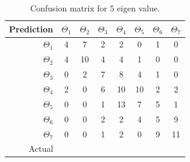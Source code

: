 \documentclass[runningheads,a4paper]{llncs}
\begin{document}
\begin{table}
\centering
\caption{Confusion matrix for $5$ eigen value.}
\label{tab:conf5}
\begin{tabular}{@{}r|ccccccc@{}}
\toprule
Prediction & \multicolumn{1}{r}{$\Theta_1$} & \multicolumn{1}{r}{$\Theta_2$} & \multicolumn{1}{r}{$\Theta_3$} & \multicolumn{1}{r}{$\Theta_4$} & \multicolumn{1}{r}{$\Theta_5$} & \multicolumn{1}{r}{$\Theta_6$} & \multicolumn{1}{r}{$\Theta_7$} \\ \midrule
$\Theta_1$ & 4                              & 7                              & 2                              & 2                              & 0                              & 1                              & 0                              \\
$\Theta_2$ & 4                              & 10                             & 4                              & 4                              & 1                              & 0                              & 0                              \\
$\Theta_3$ & 0                              & 2                              & 7                              & 8                              & 4                              & 1                              & 0                              \\
$\Theta_4$ & 2                              & 0                              & 6                              & 10                             & 10                             & 2                              & 2                              \\
$\Theta_5$ & 0                              & 0                              & 1                              & 13                             & 7                              & 5                              & 1                              \\
$\Theta_6$ & 0                              & 0                              & 2                              & 2                              & 4                              & 5                              & 9                              \\
$\Theta_7$ & 0                              & 0                              & 1                              & 2                              & 0                              & 9                              & 11                             \\ \midrule
Actual     & \multicolumn{1}{l}{}           & \multicolumn{1}{l}{}           & \multicolumn{1}{l}{}           & \multicolumn{1}{l}{}           & \multicolumn{1}{l}{}           & \multicolumn{1}{l}{}           & \multicolumn{1}{l}{}           \\ \cmidrule(r){1-1}
\end{tabular}
\end{table}
\end{document}
